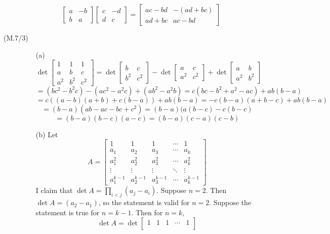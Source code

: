 \begin{description}
$$\begin{bmatrix}
a & -b \\
b & a
\end{bmatrix}\begin{bmatrix}
c & -d \\
d & c
\end{bmatrix} = \begin{bmatrix}
ac - bd & -(ad + bc) \\
ad + bc & ac - bd
\end{bmatrix}$$
\item[(M.7/3)]
\begin{itemize}
\item[(a)]
$$\det\begin{bmatrix}
1 & 1 & 1 \\
a & b & c \\
a^2 & b^2 & c^2
\end{bmatrix} = \det\begin{bmatrix}
b & c \\
b^2 & c^2
\end{bmatrix} - \det\begin{bmatrix}
a & c \\
a^2 & c^2
\end{bmatrix} + \det\begin{bmatrix}
a & b \\
a^2 & b^2
\end{bmatrix}$$
$$= (bc^2 - b^2c) - (ac^2 - a^2c) + (ab^2 - a^2b) = c(bc  - b^2 + a^2 - ac) + ab(b - a)$$
$$= c((a - b)(a + b) + c(b - a)) + ab(b - a) = -c(b - a)(a + b - c) + ab(b - a)$$
$$= (b - a)(ab - ac - bc + c^2) = (b - a)(a(b - c) - c(b - c)$$
$$= (b - a)(b - c)(a - c) = (b - a)(c - a)(c - b)$$
\item[(b)]
Let 
$$A = \begin{bmatrix}
1 & 1 & 1 & \cdots & 1 \\
a_1 & a_2 & a_3 & \cdots & a_k \\
a_1^2 & a_2^2 & a_3^2 & \cdots & a_k^2 \\
\vdots & \vdots & \vdots & \ddots & \vdots \\
a_1^{k-1} & a_2^{k-1} & a_3^{k-1} & \cdots & a_k^{k-1}
\end{bmatrix}$$
I claim that $\det A = \prod_{i < j}(a_j - a_i)$. Suppose $n = 2$. Then $\det A = (a_2 - a_1)$, so the statement is valid for $n = 2$. Suppose the statement is true for $n = k - 1$. Then for $n = k$,
$$\det A = \det\begin{bmatrix}
1 & 1 & 1 & \cdots & 1 \\

\end{bmatrix}$$
\end{itemize}
\end{description}

